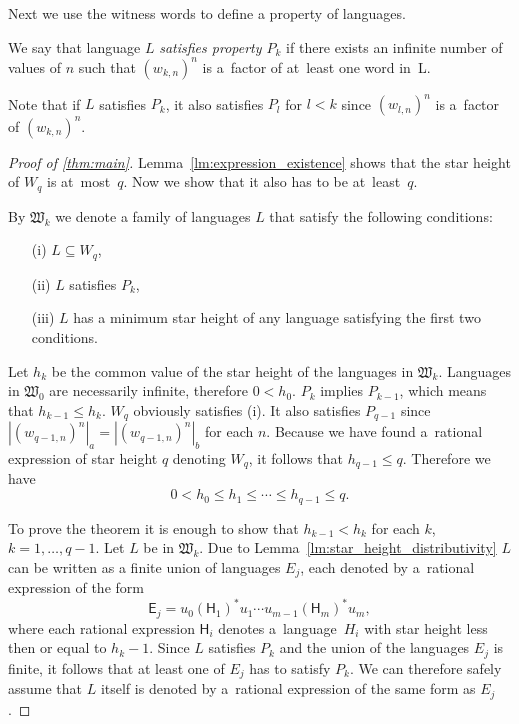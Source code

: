 Next we use the witness words to define a property of languages.

\begin{defn}
    We say that language $L$ \emph{satisfies property $P_k$} if there exists an infinite number of values of $n$ such that ${(w_{k,n})}^n$ is a~factor of at~least one word in~L.
\end{defn}

Note that if $L$ satisfies $P_k$, it also satisfies $P_l$ for $l < k$ since ${(w_{l,n})}^n$ is a~factor of ${(w_{k,n})}^n$.

\begin{proof}[Proof of \autoref*{thm:main}]
    Lemma~\ref*{lm:expression_existence} shows that the star height of $W_q$ is at~most~$q$. Now we show that it also has to be at~least~$q$.

    By $\mathfrak{W}_k$ we denote a family of languages $L$ that satisfy the following conditions:
    \begin{itemize}
        \item[(i)] $L \subseteq W_q$,
        \item[(ii)] $L$ satisfies $P_k$,
        \item[(iii)] $L$ has a minimum star height of any language satisfying the first two conditions.
    \end{itemize}

    Let $h_k$ be the common value of the star height of the languages in $\mathfrak{W}_k$. Languages in $\mathfrak{W}_0$ are necessarily infinite, therefore $0 < h_0$. $P_k$ implies $P_{k-1}$, which means that  $h_{k-1} \leq h_k$. $W_q$ obviously satisfies (i). It also satisfies $P_{q-1}$ since $|{(w_{q-1,n})}^n|_a = |{(w_{q-1,n})}^n|_b$ for each $n$. Because we have found a~rational expression of star height $q$ denoting $W_q$, it follows that $h_{q-1} \leq q$. Therefore we have
    \[
        0 < h_0 \leq h_1 \leq \dotsb \leq h_{q-1} \leq q.
    \]

    To prove the theorem it is enough to show that $h_{k-1} < h_k$ for each $k$, $k=1, \dotsc, q-1$. Let $L$ be in $\mathfrak{W}_k$. Due to Lemma~\ref*{lm:star_height_distributivity} $L$ can be written as a finite union of languages $E_j$, each denoted by a~rational expression of the form
    \[
        \mathsf{E}_j = u_0{(\mathsf{H}_1)}^*u_1 \dotsm u_{m-1}{(\mathsf{H}_m)}^*u_m,
    \]
    where each rational expression $\mathsf{H}_i$ denotes a~language~$H_i$ with star height less then or equal to $h_k-1$. Since $L$ satisfies $P_k$ and the union of the languages $E_j$ is finite, it follows that at least one of $E_j$ has to satisfy $P_k$. We can therefore safely assume that $L$ itself is denoted by a~rational expression of the same form as $E_j$.


\end{proof}
